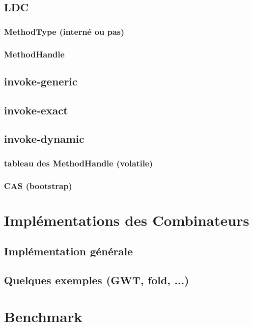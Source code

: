 \documentclass{sigplanconf}
\begin{document}
  \subsection{LDC}

    \subsubsection{MethodType (intern\'e ou pas)}
    \subsubsection{MethodHandle}

  \subsection{invoke-generic}
  \subsection{invoke-exact}
  \subsection{invoke-dynamic}

    \subsubsection{tableau des MethodHandle (volatile)}
    \subsubsection{CAS (bootstrap)}

\section{Impl\'ementations des Combinateurs}

  \subsection{Impl\'ementation g\'en\'erale}
  \subsection{Quelques exemples (GWT, fold, ...)}

\section{Benchmark}  
\end{document}
